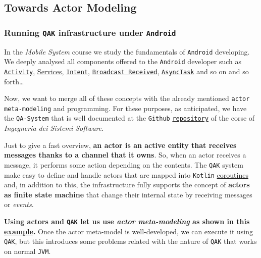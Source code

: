 \subsection{Towards Actor Modeling}

\subsubsection{Running \texttt{QAK} infrastructure under \texttt{Android}}

In the \textit{Mobile System} course we study the fundamentals of \texttt{Android} developing.
We deeply analysed all components offered to the \texttt{Android} developer such as \href{https://developer.android.com/reference/android/app/Activity}{\texttt{Activity}}, \href{https://developer.android.com/guide/components/services}{Services}, \href{https://developer.android.com/reference/android/content/Intent}{\texttt{Intent}},
\href{https://developer.android.com/guide/components/broadcasts}{\texttt{Broadcast Received}}, \href{https://developer.android.com/reference/android/os/AsyncTask}{\texttt{AsyncTask}} and so on and so forth\dots

Now, we want to merge all of these concepts with the already mentioned \texttt{actor meta-modeling} and programming. For these purposes, as anticipated, we have the \texttt{QA-System} that is well documented at the \texttt{Github} \href{https://htmlpreview.github.io/?https://github.com/anatali/issLab2022/blob/main/it.unibo.issLabStart/userDocs/Dispense/lezioni/html/QakIntro.html}{\texttt{repository}} of the corse of \textit{Ingegneria dei Sistemi Software}.

Just to give a fast overview, \textbf{an actor is an active entity that receives messages thanks to a channel that it owns}. So, when an actor receives a message, it performs some action depending on the contents. The \texttt{QAK} system make easy to define and handle actors that are mapped into \texttt{Kotlin} \href{https://developer.android.com/kotlin/coroutines?gclsrc=ds&gclsrc=ds}{coroutines} and, in addition to this, the infrastructure fully supports the concept of \textbf{actors as finite state machine} that change their internal state by receiving messages or \textit{events}.

\textbf{Using actors and \texttt{QAK} let us use \textit{actor meta-modeling} as shown in this \href{https://htmlpreview.github.io/?https://github.com/anatali/issLab2022/blob/main/it.unibo.issLabStart/userDocs/Dispense/lezioni/html/QakIntro.html\#qak-un-esempio-piu-articolato}{example}.}
Once the actor meta-model is well-developed, we can execute it using \texttt{QAK}, but this introduces some problems related with the nature of \texttt{QAK} that works on normal \texttt{JVM}.



